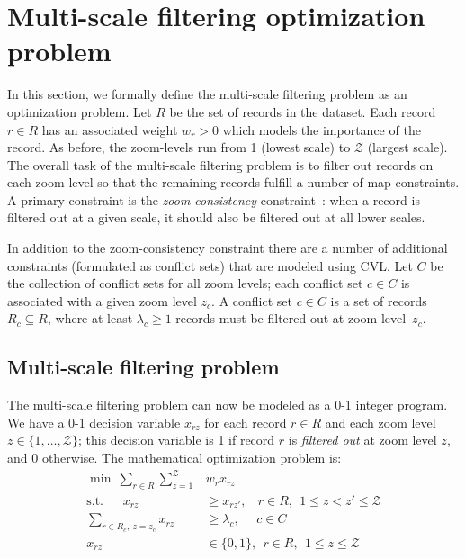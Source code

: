 \section{Multi-scale filtering optimization problem}
\label{sec:optimizationmodel}

In this section, we formally define the multi-scale filtering problem as an optimization problem. Let $R$ be the set of records in the dataset. Each record $r \in R$ has an associated weight $w_r > 0$ which models the importance of the record. As before, the zoom-levels run from 1 (lowest scale) to $\mathcal{Z}$ (largest scale). The overall task of the multi-scale filtering problem is to filter out records on each zoom level so that the remaining records fulfill a number of map constraints. A primary constraint is the \emph{zoom-consistency} constraint~\cite{sarma2012fusiontables}: when a record is filtered out at a given scale, it should also be filtered out at all lower scales. 

In addition to the zoom-consistency constraint there are a number of additional constraints (formulated as conflict sets) that are modeled using CVL. Let $C$ be the collection of conflict sets for all zoom levels; each conflict set $c \in C$ is associated with a given zoom level $z_c$. A conflict set $c \in C$ is a set of records $R_c \subseteq R$, where at least $\lambda_c \geq 1$ records must be filtered out at zoom level~$z_c$. 



\subsection{Multi-scale filtering problem}

The multi-scale filtering problem can now be modeled as a 0-1 integer program. We have a 0-1 decision variable $x_{rz}$ for each record $r \in R$ and each zoom level $z \in \{1,\ldots, \mathcal{Z}\}$; this decision variable is 1 if record $r$ is \emph{filtered out} at zoom level $z$, and 0 otherwise. The mathematical optimization problem is:
\begin{align}
  \label{eq:objective}
  \min ~\sum_{r \in R} \sum_{z=1}^\mathcal{Z} &w_r x_{rz} \\
  \label{eq:zoom-consistency}
  \mbox{s.t.}~~~~~~~x_{rz} &\geq x_{rz'}, ~~~~r \in R, ~~1 \leq z < z' \leq \mathcal{Z} \\
  \label{eq:general-constraints}
  \sum_{r \in R_c, ~z = z_c} x_{rz} &\geq \lambda_c, ~~~~~~ c \in C \\
  x_{rz} & \in \{0, 1\}, ~~ r \in R, ~~1 \leq z \leq \mathcal{Z}
\end{align}

